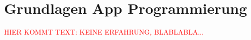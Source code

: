 \chapter{Grundlagen App Programmierung}
\label{sec:GrundlagenAppProgrammierung}

\textcolor{red}{HIER KOMMT TEXT: KEINE ERFAHRUNG, BLABLABLA...}









